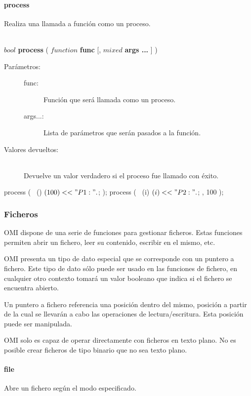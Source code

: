 \paragraph{process}
Realiza una llamada a función como un proceso.

\begin{framed}
\hfill \\ $bool$ \textbf{process} ( $function$ \textbf{func} [, $mixed$ \textbf{args ...} ]  )  
\begin{description}
\item [Parámetros:] \hfill 
   \begin{description}
   \item[func:] Función que será llamada como un proceso.
   \item[args...:] Lista de parámetros que serán pasados a la función.
   \end{description}
\item[Valores devueltos:] \hfill \\
   Devuelve un valor verdadero si el proceso fue llamado con éxito.
\end{description}
\end{framed}

\begin{myverbatim}  
   process ( ~() { $(100) << "P1:".$; } );
   process ( ~(i) { $(i) << "P2:".$; }, 100 );  
\end{myverbatim}

\subsubsection{Ficheros}
OMI dispone de una serie de funciones para gestionar ficheros. Estas funciones permiten
abrir un fichero, leer su contenido, escribir en el mismo, etc.

OMI presenta un tipo de dato especial que se corresponde con un puntero a fichero. Este tipo 
de  dato sólo puede ser usado en las funciones de fichero, en cualquier otro contexto 
tomará un valor booleano que indica si el fichero se encuentra abierto. 

Un puntero a fichero referencia una posición dentro del mismo, posición a partir de la cual 
se llevarán a cabo las operaciones de lectura/escritura. Esta posición puede ser manipulada.

OMI solo es capaz de operar directamente con ficheros en texto plano. No es posible crear 
ficheros de tipo binario que no sea texto plano.

\paragraph{file}
Abre un fichero según el modo especificado. 

